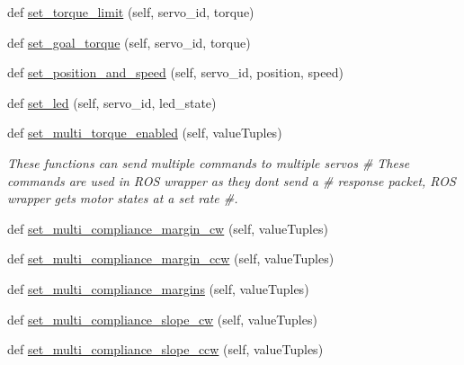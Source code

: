 \begin{DoxyCompactItemize}
def \hyperlink{classdynamixel__driver_1_1dynamixel__io_1_1_dynamixel_i_o_a77333ce0f4d09a02be80b48cdc4abda3}{set\+\_\+torque\+\_\+limit} (self, servo\+\_\+id, torque)
\item 
def \hyperlink{classdynamixel__driver_1_1dynamixel__io_1_1_dynamixel_i_o_a5d9728d7f0159ccd73fa6de0b1bfb402}{set\+\_\+goal\+\_\+torque} (self, servo\+\_\+id, torque)
\item 
def \hyperlink{classdynamixel__driver_1_1dynamixel__io_1_1_dynamixel_i_o_af71f76e0add41cdb296082acf75fbe2c}{set\+\_\+position\+\_\+and\+\_\+speed} (self, servo\+\_\+id, position, speed)
\item 
def \hyperlink{classdynamixel__driver_1_1dynamixel__io_1_1_dynamixel_i_o_a72228e3b0c55a624300a4cfba0e2d07f}{set\+\_\+led} (self, servo\+\_\+id, led\+\_\+state)
\item 
def \hyperlink{classdynamixel__driver_1_1dynamixel__io_1_1_dynamixel_i_o_a131a8a5ce4168f260e0661c2867155d2}{set\+\_\+multi\+\_\+torque\+\_\+enabled} (self, value\+Tuples)
\begin{DoxyCompactList}\small\item\em These functions can send multiple commands to multiple servos \# These commands are used in R\+OS wrapper as they don\textquotesingle{}t send a \# response packet, R\+OS wrapper gets motor states at a set rate \#. \end{DoxyCompactList}\item 
def \hyperlink{classdynamixel__driver_1_1dynamixel__io_1_1_dynamixel_i_o_a57b4bb815b4946e8759c512c3a7aec90}{set\+\_\+multi\+\_\+compliance\+\_\+margin\+\_\+cw} (self, value\+Tuples)
\item 
def \hyperlink{classdynamixel__driver_1_1dynamixel__io_1_1_dynamixel_i_o_a20243d60946e850c4bccf94edfa2504a}{set\+\_\+multi\+\_\+compliance\+\_\+margin\+\_\+ccw} (self, value\+Tuples)
\item 
def \hyperlink{classdynamixel__driver_1_1dynamixel__io_1_1_dynamixel_i_o_ab6ae4c7448f85ee22a95510a23be04b2}{set\+\_\+multi\+\_\+compliance\+\_\+margins} (self, value\+Tuples)
\item 
def \hyperlink{classdynamixel__driver_1_1dynamixel__io_1_1_dynamixel_i_o_a115695cc45ce343d0787fcc3c0bf6e7b}{set\+\_\+multi\+\_\+compliance\+\_\+slope\+\_\+cw} (self, value\+Tuples)
\item 
def \hyperlink{classdynamixel__driver_1_1dynamixel__io_1_1_dynamixel_i_o_a3c59c5ea5e5e0262fc43d0b2603ca444}{set\+\_\+multi\+\_\+compliance\+\_\+slope\+\_\+ccw} (self, value\+Tuples)
\item 

\end{DoxyCompactItemize}
